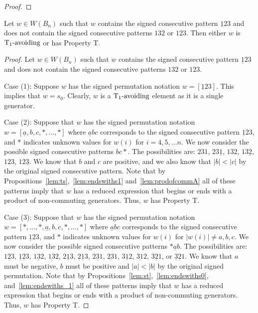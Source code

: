 \begin{proposition}
\begin{proof}
\end{proof}	
\end{proposition}

\begin{proposition}\label{lem:123}
Let $w \in W(B_n)$ such that $w$ contains the signed consecutive pattern $\underline{1}23$ and does not contain the signed consecutive patterns $132$ or $123$. Then either $w$ is $\operatorname{T_1-\mathrm{avoiding}}$ or has Property T.
\begin{proof}
	Let $w \in W(B_n)$ such that $w$ contains the signed consecutive pattern $\underline{1}23$ and does not contain the signed consecutive patterns $132$ or $123$.
	
	Case (1): Suppose $w$ has the signed permutation notation $w=[\underline{1}23]$. This implies that $w=s_0$. Clearly, $w$ is a $\operatorname{T_1-\mathrm{avoiding}}$ element as it is a single generator.
	
	Case (2): Suppose that $w$ has the signed permutation notation $w=[\underline{a},b,c, \ast, \ldots, \ast]$ where $\underline{a}bc$ corresponds to the signed consecutive pattern $\underline{1}23$, and $\ast$ indicates unknown values for $w(i)$ for $i=4,5, \ldots n$. We now consider the possible signed consecutive patterns $bc \ast$. The possibilities are: $231$, $23 \underline{1}$, $132$, $13 \underline{2}$, $123$, $12 \underline{3}$. We know that $b$ and $c$ are positive, and we also know that $|b|<|c|$ by the original signed consecutive pattern. Note that by Propositions~\ref{lem:ts},~\ref{lem:endswiths1} and~\ref{lem:prodofcommA} all of these patterns imply that $w$ has a reduced expression that begins or ends with a product of non-commuting generators. Thus, $w$ has Property T.
	
	Case (3): Suppose that $w$ has the signed permutation notation $w=[\ast, \ldots, \ast, \underline{a},b,c, \ast, \ldots, \ast]$ where $\underline{a}bc$ corresponds to the signed consecutive pattern $\underline{1}23$, and $\ast$ indicates unknown values for $w(i)$ for $|w(i)|\neq a,b,c$. We now consider the possible signed consecutive patterns $\ast \underline{a} b$. The possibilities are: $1 \underline{2} 3$, $\underline{1} \underline{2} 3$, $1\underline{3}2$, $\underline{13}2$,  $2 \underline{1} 3$, $\underline{2} \underline{1} 3$, $2 \underline{3}1$, $\underline{23}1$, $3 \underline{1}2$, $\underline{31}2$, $3 \underline{2} 1$, or $\underline{3} \underline{2} 1$. We know that $a$ must be negative, $b$ must be positive and $|a|<|b|$ by the original signed permutation. Note that by Propositions~\ref{lem:st},~\ref{lem:endswiths0}, and~\ref{lem:endswiths_1} all of these patterns imply that $w$ has a reduced expression that begins or ends with a product of non-commuting generators. Thus, $w$ has Property T. 
	

\end{proof}
\end{proposition}
